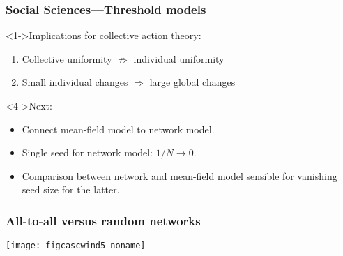 \begin{frame}
  \frametitle{Social Sciences---Threshold models}

  \begin{block}<1->{Implications for collective action theory:}
    \begin{enumerate}
    \item<2-> Collective uniformity $\not\Rightarrow$ individual uniformity
    \item<3-> Small individual changes $\Rightarrow$ large global changes
    \end{enumerate}
  \end{block}

  \begin{block}<4->{Next:}
    \begin{itemize}
    \item<4-> Connect mean-field model to network model.
    \item<5-> Single seed for network model: $1/N \rightarrow 0$.
    \item<6-> Comparison between network and mean-field model
      sensible for vanishing seed size for the latter.
    \end{itemize}
  \end{block}

\end{frame}


\begin{frame}
  \frametitle{All-to-all versus random networks}
  \centering
  \texttt{[image: figcascwind5\_noname]}\\

  
\end{frame}


